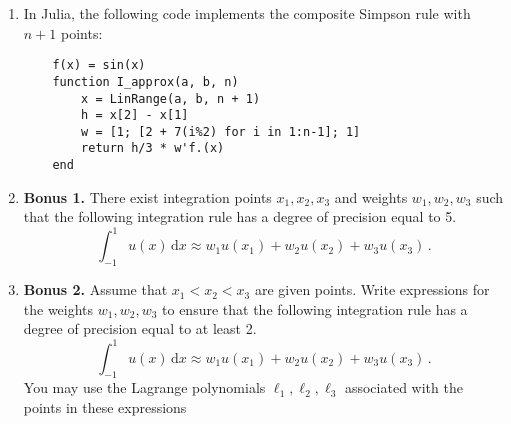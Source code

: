 \documentclass[a4paper]{article}
\renewcommand{\d}{\mathrm d}
\begin{document}
\begin{enumerate}
    \item
        In Julia, the following code implements the composite Simpson rule with $n+1$ points:
        \begin{verbatim}
    f(x) = sin(x)
    function I_approx(a, b, n)
        x = LinRange(a, b, n + 1)
        h = x[2] - x[1]
        w = [1; [2 + 7(i%2) for i in 1:n-1]; 1]
        return h/3 * w'f.(x)
    end
        \end{verbatim}

        \item \textbf{Bonus 1.} There exist integration points $x_1, x_2, x_3$ and weights $w_1, w_2, w_3$ such that the following integration rule has a degree of precision equal to 5.
            \[
                \int_{-1}^{1} u(x) \, \d x \approx w_1 u(x_1) + w_2 u(x_2) + w_3 u(x_3) \, .
            \]

        \item \textbf{Bonus 2.} Assume that $x_1 < x_2 < x_3$ are given points. 
            Write expressions for the weights $w_1, w_2, w_3$  to ensure that the following integration rule has a degree of precision equal to at least 2.
            \[
                \int_{-1}^{1} u(x) \, \d x \approx w_1 u(x_1) + w_2 u(x_2) + w_3 u(x_3) \, .
            \]
            You may use the Lagrange polynomials $\ell_1, \ell_2, \ell_3$ associated with the points in these expressions
    \end{enumerate}
\end{document}
